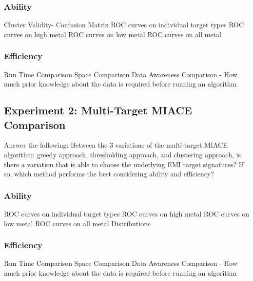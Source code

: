 \subsubsection{Ability}
Cluster Validity-\newline
Confusion Matrix\newline
ROC curves on individual target types\newline
ROC curves on high metal \newline
ROC curves on low metal\newline
ROC curves on all metal

\subsubsection{Efficiency}
Run Time Comparison \newline
Space Comparison \newline
Data Awareness Comparison - How much prior knowledge about the data is required before running an algorithm\newline



\subsection{Experiment 2: Multi-Target MIACE Comparison}
Answer the following: Between the 3 variations of the multi-target MIACE algorithm: greedy approach, thresholding approach, and clustering approach, is there a variation that is able to choose the underlying EMI target signatures? If so, which method performs the best considering ability and efficiency?

\subsubsection{Ability}
ROC curves on individual target types\newline
ROC curves on high metal \newline
ROC curves on low metal\newline
ROC curves on all metal\newline
Distributions

\subsubsection{Efficiency}
Run Time Comparison \newline
Space Comparison \newline
Data Awareness Comparison - How much prior knowledge about the data is required before running an algorithm\newline



